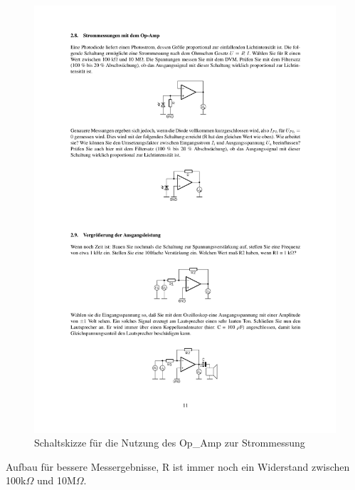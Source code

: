 \documentclass[12pt,a4paper]{article}
\begin{document}
\begin{figure}[H] 
  \centering
    \includegraphics[trim = 10mm 215mm 10mm 50mm, clip, scale = 1]{ep4_14[Page11].pdf}
  	\caption[Schaltskizze für die Nutzung des Op\_Amp zur Strommessung]{Schaltskizze für die Nutzung des Op\_Amp zur Strommessung\footnotemark}
  \label{fig:1}
\end{figure}

Aufbau für bessere Messergebnisse, R ist immer noch ein Widerstand zwischen 100k$\Omega$ und 10M$\Omega$.
\end{document}
